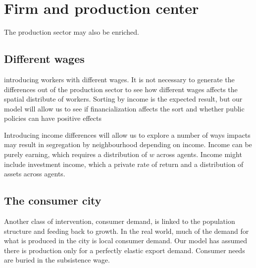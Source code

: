 





\section{Firm and production center}

The production sector may also be enriched.

\subsection{Different wages} 

introducing workers with different wages. It is not necessary to generate the differences out of the production sector to see how different wages affects the spatial distribute of workers. Sorting by income is the expected result, but our model will allow us to  see if financialization affects the sort and whether public policies can have positive effects

Introducing income differences will %
allow us to explore a number of ways impacts may result in segregation by neighbourhood depending on income. Income can be purely earning, which requires a distribution of $w$ across agents. Income  might include investment income, which  a private rate of return and a distribution of assets across agents. 

\subsection{The consumer city}

Another class of intervention, consumer demand, is linked to the population structure and feeding back to growth. In the real world, much of the demand for what is produced in the city is local consumer demand.  Our model has assumed there is production only for a perfectly elastic export demand. Consumer needs are buried in the subsistence wage. 

